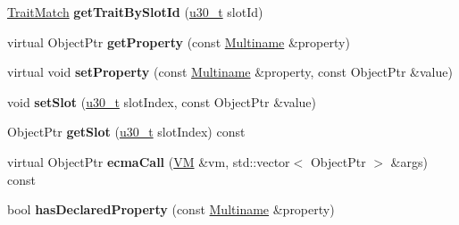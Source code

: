 \begin{DoxyCompactItemize}
\item 
\hypertarget{classjswf_1_1avm2_1_1_object_a131cc416f028567451a06dee37966b72}{\hyperlink{structjswf_1_1avm2_1_1_trait_match}{Trait\+Match} {\bfseries get\+Trait\+By\+Slot\+Id} (\hyperlink{namespacejswf_aa10d9ddca2a6a5debdc261dfae3d1117}{u30\+\_\+t} slot\+Id)}\label{classjswf_1_1avm2_1_1_object_a131cc416f028567451a06dee37966b72}

\item 
\hypertarget{classjswf_1_1avm2_1_1_object_afda0bad45f86f4d69c2466c863528160}{virtual Object\+Ptr {\bfseries get\+Property} (const \hyperlink{structjswf_1_1avm2_1_1_multiname}{Multiname} \&property)}\label{classjswf_1_1avm2_1_1_object_afda0bad45f86f4d69c2466c863528160}

\item 
\hypertarget{classjswf_1_1avm2_1_1_object_a1dec9b414e64bd9635a86d5f47379f2f}{virtual void {\bfseries set\+Property} (const \hyperlink{structjswf_1_1avm2_1_1_multiname}{Multiname} \&property, const Object\+Ptr \&value)}\label{classjswf_1_1avm2_1_1_object_a1dec9b414e64bd9635a86d5f47379f2f}

\item 
\hypertarget{classjswf_1_1avm2_1_1_object_af7ce6421f0fb63694d83993d8a1e0b77}{void {\bfseries set\+Slot} (\hyperlink{namespacejswf_aa10d9ddca2a6a5debdc261dfae3d1117}{u30\+\_\+t} slot\+Index, const Object\+Ptr \&value)}\label{classjswf_1_1avm2_1_1_object_af7ce6421f0fb63694d83993d8a1e0b77}

\item 
\hypertarget{classjswf_1_1avm2_1_1_object_ad5d5b6a0f60b7a0ae41304753c8c6fdc}{Object\+Ptr {\bfseries get\+Slot} (\hyperlink{namespacejswf_aa10d9ddca2a6a5debdc261dfae3d1117}{u30\+\_\+t} slot\+Index) const }\label{classjswf_1_1avm2_1_1_object_ad5d5b6a0f60b7a0ae41304753c8c6fdc}

\item 
\hypertarget{classjswf_1_1avm2_1_1_object_a3d2b390062f97d6f563eabdc59dff3e9}{virtual Object\+Ptr {\bfseries ecma\+Call} (\hyperlink{classjswf_1_1avm2_1_1_v_m}{V\+M} \&vm, std\+::vector$<$ Object\+Ptr $>$ \&args) const }\label{classjswf_1_1avm2_1_1_object_a3d2b390062f97d6f563eabdc59dff3e9}

\item 
\hypertarget{classjswf_1_1avm2_1_1_object_a68d84b207f96c834586769298b4037e9}{bool {\bfseries has\+Declared\+Property} (const \hyperlink{structjswf_1_1avm2_1_1_multiname}{Multiname} \&property)}\label{classjswf_1_1avm2_1_1_object_a68d84b207f96c834586769298b4037e9}


\end{DoxyCompactItemize}
